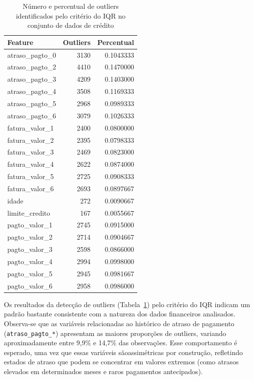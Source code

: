\documentclass[
  brazilian,
  12pt,
  letterpaper,
  DIV=11,
  numbers=noendperiod]{scrartcl}
\begin{document}
{

\begin{longtable}[]{@{}lrr@{}}

\caption{\label{tbl-outliers-default}Número e percentual de outliers
identificados pelo critério do IQR no conjunto de dados de crédito}

\tabularnewline

\toprule\noalign{}
Feature & Outliers & Percentual \\
\midrule\noalign{}
\endhead
\bottomrule\noalign{}
\endlastfoot
atraso\_pagto\_0 & 3130 & 0.1043333 \\
atraso\_pagto\_2 & 4410 & 0.1470000 \\
atraso\_pagto\_3 & 4209 & 0.1403000 \\
atraso\_pagto\_4 & 3508 & 0.1169333 \\
atraso\_pagto\_5 & 2968 & 0.0989333 \\
atraso\_pagto\_6 & 3079 & 0.1026333 \\
fatura\_valor\_1 & 2400 & 0.0800000 \\
fatura\_valor\_2 & 2395 & 0.0798333 \\
fatura\_valor\_3 & 2469 & 0.0823000 \\
fatura\_valor\_4 & 2622 & 0.0874000 \\
fatura\_valor\_5 & 2725 & 0.0908333 \\
fatura\_valor\_6 & 2693 & 0.0897667 \\
idade & 272 & 0.0090667 \\
limite\_credito & 167 & 0.0055667 \\
pagto\_valor\_1 & 2745 & 0.0915000 \\
pagto\_valor\_2 & 2714 & 0.0904667 \\
pagto\_valor\_3 & 2598 & 0.0866000 \\
pagto\_valor\_4 & 2994 & 0.0998000 \\
pagto\_valor\_5 & 2945 & 0.0981667 \\
pagto\_valor\_6 & 2958 & 0.0986000 \\

\end{longtable}

}

Os resultados da detecção de outliers
(Tabela~\ref{tbl-outliers-default}) pelo critério do IQR indicam um
padrão bastante consistente com a natureza dos dados financeiros
analisados. Observa-se que as variáveis relacionadas ao histórico de
atraso de pagamento (\texttt{atraso\_pagto\_*}) apresentam as maiores
proporções de outliers, variando aproximadamente entre 9,9\% e 14,7\%
das observações. Esse comportamento é esperado, uma vez que essas
variáveis sãoassimétricas por construção, refletindo estados de atraso
que podem se concentrar em valores extremos (como atrasos elevados em
determinados meses e raros pagamentos antecipados).
\end{document}
